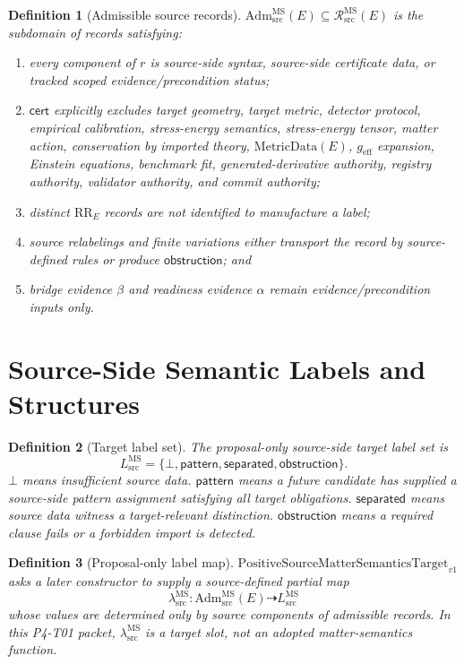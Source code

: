 \documentclass[11pt]{article}
\newcommand{\PMSTarget}{\mathrm{PositiveSourceMatterSemanticsTarget}_{v1}}
\newcommand{\RecSrc}{\mathcal R^{\mathrm{MS}}_{\mathrm{src}}}
\newcommand{\AdmSrc}{\mathrm{Adm}^{\mathrm{MS}}_{\mathrm{src}}}
\newcommand{\LabSrc}{L^{\mathrm{MS}}_{\mathrm{src}}}
\newcommand{\lambdaSrc}{\lambda^{\mathrm{MS}}_{\mathrm{src}}}
\newcommand{\Bottom}{\bot}
\newcommand{\Pattern}{\mathsf{pattern}}
\newcommand{\Separated}{\mathsf{separated}}
\newcommand{\Obstruction}{\mathsf{obstruction}}
\newcommand{\RRE}{\mathrm{RR}_E}
\newcommand{\MetricData}{\mathrm{MetricData}}
\newcommand{\geff}{g_{\mathrm{eff}}}
\newtheorem{definition}{Definition}
\begin{document}
\begin{definition}[Admissible source records]
\(\AdmSrc(E)\subseteq\RecSrc(E)\) is the subdomain of records satisfying:
\begin{enumerate}[label=A\arabic*.,leftmargin=*]
  \item every component of \(r\) is source-side syntax, source-side
  certificate data, or tracked scoped evidence/precondition status;
  \item \(\mathsf{cert}\) explicitly excludes target geometry, target metric,
  detector protocol, empirical calibration, stress-energy semantics,
  stress-energy tensor, matter action, conservation by imported theory,
  \(\MetricData(E)\), \(\geff\) expansion, Einstein equations, benchmark fit,
  generated-derivative authority, registry authority, validator authority, and
  commit authority;
  \item distinct \(\RRE\) records are not identified to manufacture a label;
  \item source relabelings and finite variations either transport the record
  by source-defined rules or produce \(\Obstruction\); and
  \item bridge evidence \(\beta\) and readiness evidence \(\alpha\) remain
  evidence/precondition inputs only.
\end{enumerate}
\end{definition}

\section{Source-Side Semantic Labels and Structures}

\begin{definition}[Target label set]
The proposal-only source-side target label set is
\[
  \LabSrc=\{\Bottom,\Pattern,\Separated,\Obstruction\}.
\]
\(\Bottom\) means insufficient source data. \(\Pattern\) means a future
candidate has supplied a source-side pattern assignment satisfying all target
obligations. \(\Separated\) means source data witness a target-relevant
distinction. \(\Obstruction\) means a required clause fails or a forbidden
import is detected.
\end{definition}

\begin{definition}[Proposal-only label map]
\(\PMSTarget\) asks a later constructor to supply a source-defined partial map
\[
  \lambdaSrc:\AdmSrc(E)\dashrightarrow \LabSrc
\]
whose values are determined only by source components of admissible records.
In this P4-T01 packet, \(\lambdaSrc\) is a target slot, not an adopted
matter-semantics function.
\end{definition}
\end{document}
